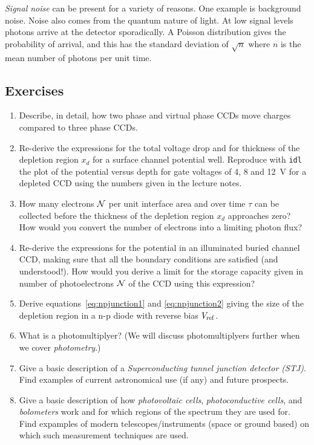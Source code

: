 \documentclass{article}
\begin{document}
{\it Signal noise} can be present for a variety of reasons. One example is
background noise. Noise also comes from the quantum nature of light. At
low signal levels photons arrive at the detector sporadically. A Poisson
distribution gives the probability of arrival, and this has the standard
deviation of $\sqrt{n}$ where $n$ is the mean number of photons per unit
time. 


\subsection*{Exercises}

\begin{enumerate}
\item Describe, in detail, how two phase and virtual phase CCDs move charges
compared to three phase CCDs.
\item Re-derive the expressions for the total voltage drop and for thickness 
of the depletion region $x_d$ for a surface channel potential well. Reproduce
with {\tt idl} the plot of the potential versus depth for gate voltages of 
4, 8 and 12~V for a depleted CCD using the numbers given in the lecture notes.
\item How many electrons $\cal{N}$ per unit interface area and over time $\tau$
can be collected before the thickness of the depletion region $x_d$ 
approaches zero? How would you convert the number of electrons into a limiting
photon flux?
\item Re-derive the expressions for the potential in an illuminated buried
channel CCD, making sure that all the boundary conditions are satisfied (and 
understood!). How would you derive a limit for the storage capacity given 
in number of photoelectrons $\cal{N}$ of the CCD using this
expression?
\item Derive equations~\ref{eq:npjunction1} and \ref{eq:npjunction2}
  giving the size of the depletion region in a n-p diode with reverse
  bias $V_{\rm ref}$.
\item What is a photomultiplyer? (We will discuss photomultiplyers
  further when we cover {\it photometry}.)
\item Give a basic description of a {\it Superconducting tunnel
    junction detector (STJ)}. Find examples of current
  astronomical use (if any) and future prospects.
\item Give a basic description of how {\it photovoltaic cells}, 
{\it photoconductive cells}, and {\it bolometers} work and for which regions
of the spectrum they are used for. Find expamples of modern telescopes/instruments
(space or ground based) on which such measurement techniques are used.
\end{enumerate}
\end{document}
